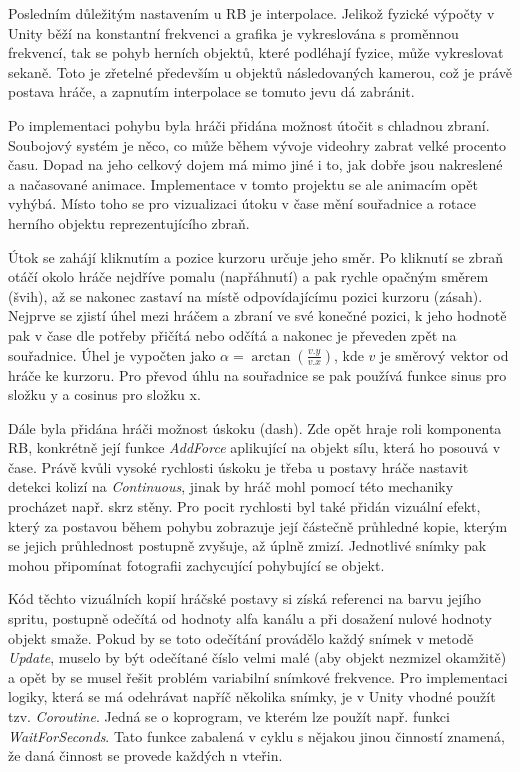 \documentclass[FM,Proj]{tulthesis}
\begin{document}
	Posledním důležitým nastavením u RB je interpolace. Jelikož fyzické výpočty v Unity běží na konstantní frekvenci a grafika je vykreslována s proměnnou frekvencí, tak se pohyb herních objektů, které podléhají fyzice, může vykreslovat sekaně. Toto je zřetelné především u objektů následovaných kamerou, což je právě postava hráče, a zapnutím interpolace se tomuto jevu dá zabránit.
	\cite{UnityDocsInterpolation}
	
	Po implementaci pohybu byla hráči přidána možnost útočit s chladnou zbraní. Soubojový systém je něco, co může během vývoje videohry zabrat velké procento času. Dopad na jeho celkový dojem má mimo jiné i to, jak dobře jsou nakreslené a načasované animace. Implementace v tomto projektu se ale animacím opět vyhýbá. Místo toho se pro vizualizaci útoku v čase mění souřadnice a rotace herního objektu reprezentujícího zbraň.
	
	Útok se zahájí kliknutím a pozice kurzoru určuje jeho směr. Po kliknutí se zbraň otáčí okolo hráče nejdříve pomalu (napřáhnutí) a pak rychle opačným směrem (švih), až se nakonec zastaví na místě odpovídajícímu pozici kurzoru (zásah). Nejprve se zjistí úhel mezi hráčem a zbraní ve své konečné pozici, k jeho hodnotě pak v čase dle potřeby přičítá nebo odčítá a nakonec je převeden zpět na souřadnice. Úhel je vypočten jako $\alpha = \arctan{(\frac{v.y}{v.x})}$, kde $v$ je směrový vektor od hráče ke kurzoru. Pro převod úhlu na souřadnice se pak používá funkce sinus pro složku y a cosinus pro složku x.
	
	Dále byla přidána hráči možnost úskoku (dash). Zde opět hraje roli komponenta RB, konkrétně její funkce \textit{AddForce} aplikující na objekt sílu, která ho posouvá v čase. Právě kvůli vysoké rychlosti úskoku je třeba u postavy hráče nastavit detekci kolizí na \textit{Continuous}, jinak by hráč mohl pomocí této mechaniky procházet např. skrz stěny. Pro pocit rychlosti byl také přidán vizuální efekt, který za postavou během pohybu zobrazuje její částečně průhledné kopie, kterým se jejich průhlednost postupně zvyšuje, až úplně zmizí. Jednotlivé snímky pak mohou připomínat fotografii zachycující pohybující se objekt.
	
	Kód těchto vizuálních kopií hráčské postavy si získá referenci na barvu jejího spritu, postupně odečítá od hodnoty alfa kanálu a při dosažení nulové hodnoty objekt smaže. Pokud by se toto odečítání provádělo každý snímek v metodě \textit{Update}, muselo by být odečítané číslo velmi malé (aby objekt nezmizel okamžitě) a opět by se musel řešit problém variabilní snímkové frekvence. Pro implementaci logiky, která se má odehrávat napříč několika snímky, je v Unity vhodné použít tzv. \textit{Coroutine}. Jedná se o koprogram, ve kterém lze použít např. funkci \textit{WaitForSeconds}. Tato funkce zabalená v cyklu s nějakou jinou činností znamená, že daná činnost se provede každých n vteřin. 
	
\end{document}
